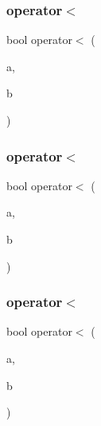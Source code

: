\mbox{\label{class_f_l___f_p_a7a645d400e5b6aeaf8a3ea2a4512ab9e}} 
\subsubsection{\texorpdfstring{operator$<$}{operator<}\hspace{0.1cm}{\footnotesize\ttfamily [1/3]}}
{\footnotesize\ttfamily bool operator$<$ (\begin{DoxyParamCaption}\item[{const \hyperlink{class_f_l___f_p}{F\+L\+\_\+\+FP} \&}]{a,  }\item[{const \hyperlink{class_f_l___f_p}{F\+L\+\_\+\+FP} \&}]{b }\end{DoxyParamCaption})\hspace{0.3cm}{\ttfamily [friend]}}

\mbox{\label{class_f_l___f_p_ae0d89fcb254db9759b80cca31de5ee00}} 
\subsubsection{\texorpdfstring{operator$<$}{operator<}\hspace{0.1cm}{\footnotesize\ttfamily [2/3]}}
{\footnotesize\ttfamily bool operator$<$ (\begin{DoxyParamCaption}\item[{const \hyperlink{class_f_l___f_p}{F\+L\+\_\+\+FP} \&}]{a,  }\item[{const double \&}]{b }\end{DoxyParamCaption})\hspace{0.3cm}{\ttfamily [friend]}}

\mbox{\label{class_f_l___f_p_af1a4354ad8a5d501c5d9f3a784ca3b95}} 
\subsubsection{\texorpdfstring{operator$<$}{operator<}\hspace{0.1cm}{\footnotesize\ttfamily [3/3]}}
{\footnotesize\ttfamily bool operator$<$ (\begin{DoxyParamCaption}\item[{const double \&}]{a,  }\item[{const \hyperlink{class_f_l___f_p}{F\+L\+\_\+\+FP} \&}]{b }\end{DoxyParamCaption})\hspace{0.3cm}{\ttfamily [friend]}}

